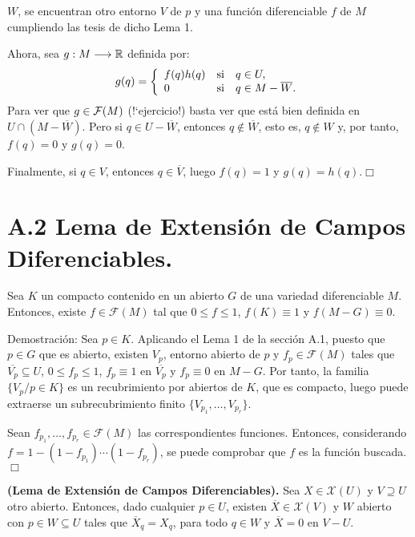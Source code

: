 \documentclass[cursovd_portada.tex]{subfiles}
\begin{document}
$W$, se encuentran otro entorno $V$ de $p$ y una funci\'{o}n diferenciable $f$ de $M$ cumpliendo las tesis de dicho
Lema 1.
\par
Ahora, sea $g:M\longrightarrow\mathbb{R}$ definida por:
$$g(q)=\left\{
\begin{array}{lll}
f(q)h(q) & {\rm si} & q\in U,\\
0 & {\rm si} & q\in M-\overline{W}.
\end{array}
\right.$$ \hs Para ver que $g\in{\cal F}(M)$ (!`ejercicio!) basta ver que est\'{a} bien definida en $U\cap
(M-\overline{W})$. Pero si $q\in U-\overline{W}$, entonces $q\notin\overline{W}$, esto es, $q\notin W$ y, por
tanto, $f(q)=0$ y $g(q)=0$.
\par
Finalmente, si $q\in V$, entonces $q\in\overline{V}$, luego $f(q)=1$ y $g(q)=h(q)$.\hfill $\Box$
\section*{A.2 Lema de Extensi\'{o}n de Campos Diferenciables.}
\begin{lemaap}
Sea $K$ un compacto contenido en un abierto $G$ de una variedad diferenciable $M$. Entonces, existe
$f\in\mathcal{F}(M)$ tal que $0\leq f\leq 1$, $f(K)\equiv 1$ y $f(M-G)\equiv 0$.
\end{lemaap}
{\sc Demostraci\'{o}n:} Sea $p\in K$. Aplicando el Lema 1 de la secci\'{o}n A.1, puesto que $p\in G$ que es abierto,
existen $V_p$, entorno abierto de $p$ y $f_p\in\mathcal{F}(M)$ tales que $\overline{V_p}\subseteq U$, $0\leq
f_p\leq 1$, $f_p\equiv 1$ en $\overline{V_p}$ y $f_p\equiv 0$ en $M-G$. Por tanto, la familia $\{V_p/p\in K\}$ es
un recubrimiento por abiertos de $K$, que es compacto, luego puede extraerse un subrecubrimiento finito
$\{V_{p_1},\dots ,V_{p_r}\}$.
\par
Sean $f_{p_1},\dots ,f_{p_r}\in\mathcal{F}(M)$ las correspondientes funciones. Entonces, considerando
$f=1-(1-f_{p_1})\cdots(1-f_{p_r})$, se puede comprobar que $f$ es la funci\'{o}n buscada.\hfill $\Box$
\begin{teoap}
{\bf (Lema de Extensi\'{o}n de Campos Diferenciables).} Sea $X\in\mathcal{X}(U)$ y $V\supseteq U$ otro abierto.
Entonces, dado cualquier $p\in U$, existen $\overline{X}\in\mathcal{X}(V)$ y $W$ abierto con $p\in W\subseteq U$
tales que $\overline{X}_q=X_q$, para todo $q\in W$ y $\overline{X}=0$ en $V-U$.
\end{teoap}
\end{document}

